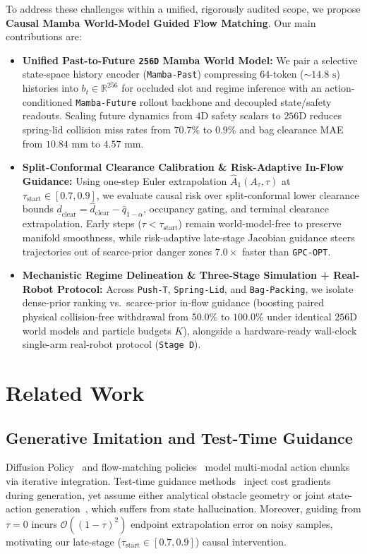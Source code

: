 \documentclass[letterpaper, 10pt, conference]{ieeeconf}
\begin{document}
To address these challenges within a unified, rigorously audited scope, we propose \textbf{Causal Mamba World-Model Guided Flow Matching}. Our main contributions are:
\begin{itemize}
    \item \textbf{Unified Past-to-Future \texttt{256D} Mamba World Model:} We pair a selective state-space history encoder (\texttt{Mamba-Past}) compressing $64$-token ($\sim 14.8\text{ s}$) histories into $b_t \in \mathbb{R}^{256}$ for occluded slot and regime inference with an action-conditioned \texttt{Mamba-Future} rollout backbone and decoupled state/safety readouts. Scaling future dynamics from $4\text{D}$ safety scalars to $256\text{D}$ reduces spring-lid collision miss rates from $70.7\%$ to $0.9\%$ and bag clearance MAE from $10.84\text{ mm}$ to $4.57\text{ mm}$.
    \item \textbf{Split-Conformal Clearance Calibration \& Risk-Adaptive In-Flow Guidance:} Using one-step Euler extrapolation $\hat{A}_1(A_\tau, \tau)$ at $\tau_{\text{start}} \in [0.7, 0.9]$, we evaluate causal risk over split-conformal lower clearance bounds $\underline{d}_{\text{clear}} = \hat{d}_{\text{clear}} - \hat{q}_{1-\alpha}$, occupancy gating, and terminal clearance extrapolation. Early steps ($\tau < \tau_{\text{start}}$) remain world-model-free to preserve manifold smoothness, while risk-adaptive late-stage Jacobian guidance steers trajectories out of scarce-prior danger zones $7.0\times$ faster than \texttt{GPC-OPT}.
    \item \textbf{Mechanistic Regime Delineation \& Three-Stage Simulation + Real-Robot Protocol:} Across \texttt{Push-T}, \texttt{Spring-Lid}, and \texttt{Bag-Packing}, we isolate dense-prior ranking vs.\ scarce-prior in-flow guidance (boosting paired physical collision-free withdrawal from $50.0\%$ to $100.0\%$ under identical $256\text{D}$ world models and particle budgets $K$), alongside a hardware-ready wall-clock single-arm real-robot protocol (\texttt{Stage D}).
\end{itemize}

\section{Related Work}

\subsection{Generative Imitation and Test-Time Guidance}
Diffusion Policy~\cite{chi2024diffusion} and flow-matching policies~\cite{lipman2023flow, black2024pi0} model multi-modal action chunks via iterative integration. Test-time guidance methods~\cite{janner2022diffuser, xiao2025safediffuser} inject cost gradients during generation, yet assume either analytical obstacle geometry or joint state-action generation~\cite{janner2022diffuser}, which suffers from state hallucination. Moreover, guiding from $\tau=0$ incurs $\mathcal{O}((1-\tau)^2)$ endpoint extrapolation error on noisy samples, motivating our late-stage ($\tau_{\text{start}} \in [0.7, 0.9]$) causal intervention.
\end{document}
